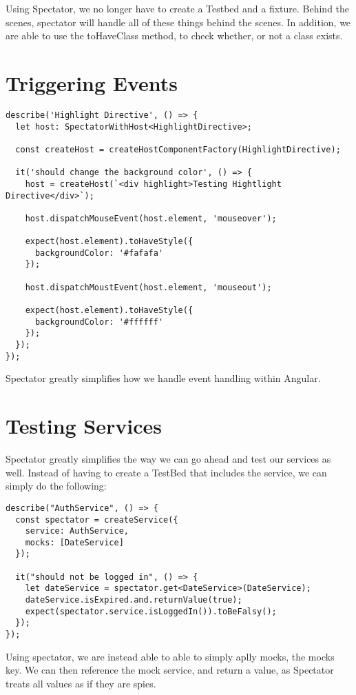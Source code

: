 Using Spectator, we no longer have to create a Testbed and a fixture. Behind
the scenes, spectator will handle all of these things behind the scenes. In
addition, we are able to use the toHaveClass method, to check whether, or not
a class exists.

\section{ Triggering Events }

\begin{lstlisting}
describe('Highlight Directive', () => {
  let host: SpectatorWithHost<HighlightDirective>;

  const createHost = createHostComponentFactory(HighlightDirective);

  it('should change the background color', () => {
    host = createHost(`<div highlight>Testing Hightlight Directive</div>`);

    host.dispatchMouseEvent(host.element, 'mouseover');

    expect(host.element).toHaveStyle({
      backgroundColor: '#fafafa'
    });

    host.dispatchMoustEvent(host.element, 'mouseout');

    expect(host.element).toHaveStyle({
      backgroundColor: '#ffffff'
    });
  });
});
\end{lstlisting}

Spectator greatly simplifies how we handle event handling within Angular.

\section{ Testing Services }
Spectator greatly simplifies the way we can go ahead and test our services as
well. Instead of having to create a TestBed that includes the service, we
can simply do the following:

\begin{lstlisting}
describe("AuthService", () => {
  const spectator = createService({
    service: AuthService,
    mocks: [DateService]
  });

  it("should not be logged in", () => {
    let dateService = spectator.get<DateService>(DateService);
    dateService.isExpired.and.returnValue(true);
    expect(spectator.service.isLoggedIn()).toBeFalsy();
  });
});
\end{lstlisting}

Using spectator, we are instead able to able to simply aplly mocks, the mocks
key. We can then reference the mock service, and return a value, as Spectator
treats all values as if they are spies.

